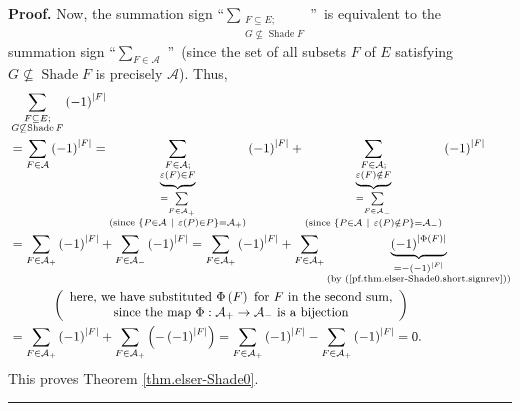\documentclass[numbers=enddot,12pt,final,onecolumn]{scrartcl}%
\theoremstyle{definition}
\newenvironment{proof}[1][Proof]{\noindent\textbf{#1.} }{\ \rule{0.5em}{0.5em}}
\let\sumnonlimits\sum
\renewcommand{\sum}{\sumnonlimits\limits}
\newenvironment{vershort}{}{}
\begin{document}
\begin{vershort}
\begin{proof}
Now, the summation sign \textquotedblleft$\sum_{\substack{F\subseteq
E;\\G\not \subseteq \operatorname*{Shade}F}}$\textquotedblright\ is equivalent
to the summation sign \textquotedblleft$\sum_{F\in\mathcal{A}}$%
\textquotedblright\ (since the set of all subsets $F$ of $E$ satisfying
$G\not \subseteq \operatorname*{Shade}F$ is precisely $\mathcal{A}$). Thus,%
\begin{align*}
&  \sum_{\substack{F\subseteq E;\\G\not \subseteq \operatorname*{Shade}%
F}}\left(  -1\right)  ^{\left\vert F\right\vert }\\
&  =\sum_{F\in\mathcal{A}}\left(  -1\right)  ^{\left\vert F\right\vert
}=\underbrace{\sum_{\substack{F\in\mathcal{A};\\\varepsilon\left(  F\right)
\in F}}}_{\substack{=\sum_{F\in\mathcal{A}_{+}}\\\text{(since }\left\{
P\in\mathcal{A}\ \mid\ \varepsilon\left(  P\right)  \in P\right\}
=\mathcal{A}_{+}\text{)}}}\left(  -1\right)  ^{\left\vert F\right\vert
}+\underbrace{\sum_{\substack{F\in\mathcal{A};\\\varepsilon\left(  F\right)
\notin F}}}_{\substack{=\sum_{F\in\mathcal{A}_{-}}\\\text{(since }\left\{
P\in\mathcal{A}\ \mid\ \varepsilon\left(  P\right)  \notin P\right\}
=\mathcal{A}_{-}\text{)}}}\left(  -1\right)  ^{\left\vert F\right\vert }\\
&  =\sum_{F\in\mathcal{A}_{+}}\left(  -1\right)  ^{\left\vert F\right\vert
}+\sum_{F\in\mathcal{A}_{-}}\left(  -1\right)  ^{\left\vert F\right\vert
}=\sum_{F\in\mathcal{A}_{+}}\left(  -1\right)  ^{\left\vert F\right\vert
}+\sum_{F\in\mathcal{A}_{+}}\underbrace{\left(  -1\right)  ^{\left\vert
\Phi\left(  F\right)  \right\vert }}_{\substack{=-\left(  -1\right)
^{\left\vert F\right\vert }\\\text{(by
(\ref{pf.thm.elser-Shade0.short.signrev}))}}}\\
&  \ \ \ \ \ \ \ \ \ \ \left(
\begin{array}
[c]{c}%
\text{here, we have substituted }\Phi\left(  F\right)  \text{ for }F\text{ in
the second sum,}\\
\text{since the map }\Phi:\mathcal{A}_{+}\rightarrow\mathcal{A}_{-}\text{ is a
bijection}%
\end{array}
\right) \\
&  =\sum_{F\in\mathcal{A}_{+}}\left(  -1\right)  ^{\left\vert F\right\vert
}+\sum_{F\in\mathcal{A}_{+}}\left(  -\left(  -1\right)  ^{\left\vert
F\right\vert }\right)  =\sum_{F\in\mathcal{A}_{+}}\left(  -1\right)
^{\left\vert F\right\vert }-\sum_{F\in\mathcal{A}_{+}}\left(  -1\right)
^{\left\vert F\right\vert }=0.
\end{align*}
This proves Theorem \ref{thm.elser-Shade0}.
\end{proof}
\end{vershort}
\end{document}
